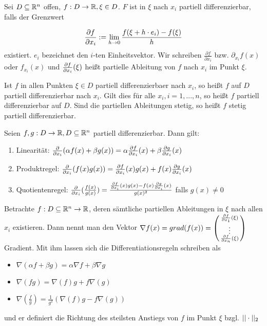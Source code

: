 \begin{definition}
	Sei $D \subseteq \mathbb{R}^n$ offen, $f : D \rightarrow \mathbb{R}, \xi \in D$. $F$ ist in $\xi$ nach  $x_i$ partiell differenzierbar, falls der Grenzwert
	
	\begin{align*}
		\frac{\partial f}{\partial x_i} := \lim_{h \rightarrow 0} \frac{f(\xi + h \cdot e_i) - f(\xi)}{h} 
	\end{align*}
	existiert. $e_i$ bezeichnet den $i$-ten Einheitsvektor.  Wir schreiben $\frac{\partial f}{\partial x_i}$ bzw. $\partial_{x_i} f(x)$ oder $f_{x_i}(x)$ und $\frac{\partial f}{\partial x_i}(\xi)$ heißt partielle Ableitung von $f$ nach $x_i$ im Punkt $\xi$.
	
	Ist $f$ in allen Punkten $\xi \in D$ partiell differenzierbaer nach $x_i$, so heißt $f$ auf $D$ partiell differenzierbar nach $x_i$. Gilt dies für alle $x_i, i=1,...,n$, so heißt $f$ partiell differenzierbar auf $D$. Sind die partiellen Ableitungen stetig, so heißt $f$ stetig partiell differenzierbar.
\end{definition}

\begin{satz}[Differentiationsregeln]
	Seien $f,g : D \rightarrow \mathbb{R}, D \subseteq \mathbb{R}^n$ partiell differenzierbar. Dann gilt:
	\begin{enumerate}[noitemsep]
		\item  Linearität: $\frac{\partial }{\partial x_i}(\alpha f(x) + \beta g(x)) = \alpha \frac{\partial f}{\partial x_i}(x) + \beta \frac{\partial g}{\partial x_i}(x) $
		\item  Produktregel: $\frac{\partial }{\partial x_i}( f(x) g(x)) = \frac{\partial f}{\partial x_i}(x)g(x) + f(x)\frac{\partial g}{\partial x_i}(x)$
		\item  Quotientenregel: $\frac{\partial }{\partial x_i}( \frac{f(x)}{g(x)}) = \frac{\frac{\partial f}{\partial x_i}(x)g(x) - f(x)\frac{\partial g}{\partial x_i}(x)}{g(x)^2}$ falls $g(x) \neq 0$
	\end{enumerate}
	
\end{satz}


\begin{definition}[Gradient]
	Betrachte $f : D \subseteq\mathbb{R}^n \rightarrow \mathbb{R}$, deren sämtliche partiellen Ableitungen in $\xi$ nach allen $x_i$ existieren. 
	Dann nennt man den Vektor $\nabla f(x) = grad(f(x)) = \left(\begin{smallmatrix}
		\frac{\partial f}{\partial x_1}(\xi) \\
		 \vdots \\
		 \frac{\partial f}{\partial x_n}(\xi)
	\end{smallmatrix}\right)$ Gradient.
	Mit ihm lassen sich die Differentiationsregeln schreiben als
	\begin{itemize}[noitemsep]
		\item  $\nabla(\alpha f + \beta g) = \alpha \nabla f + \beta \nabla g$
		\item  $\nabla (fg) = \nabla (f) g + f \nabla(g)$
		\item  $\nabla (\frac{f}{g}) = \frac{1}{g^2} (\nabla (f) g - f \nabla(g))$	
	\end{itemize}
und er definiert die Richtung des steilsten Anstiegs von $f$ im Punkt $\xi$ bzgl. $|| \cdot ||_2$
\end{definition}

